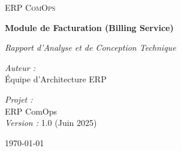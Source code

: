\documentclass[12pt,a4paper]{report}
\begin{document}
\begin{titlepage}
    \centering
    \vspace*{2cm}
    {\scshape\LARGE ERP ComOps \par}
    \vspace{1.5cm}
    {\huge\bfseries Module de Facturation (Billing Service) \par}
    \vspace{0.5cm}
    {\large\itshape Rapport d'Analyse et de Conception Technique \par}
    \vspace{1.5cm}
    
    \vfill
    \begin{minipage}{0.5\textwidth}
        \begin{flushleft} \large
            \emph{Auteur :}\\
            Équipe d'Architecture ERP
        \end{flushleft}
    \end{minipage}
    \hfill
    \begin{minipage}{0.4\textwidth}
        \begin{flushright} \large
            \emph{Projet :} \\
            ERP ComOps \\
            \emph{Version :} 1.0 (Juin 2025)
        \end{flushright}
    \end{minipage}
    
    \vfill
    {\large \today \par}
\end{titlepage}

\newpage


\newpage


\newpage


\newpage
\end{document}

